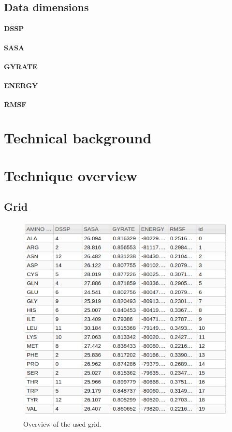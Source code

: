 \documentclass[10pt, conference]{IEEEtran}
\begin{document}
\subsection{Data dimensions}

\paragraph*{DSSP}
%


\paragraph*{SASA}
%


\paragraph*{GYRATE}
%


\paragraph*{ENERGY}
%


\paragraph*{RMSF}
%


\section{Technical background}
%

\section{Technique overview}
%

\subsection{Grid}
\begin{figure}
\includegraphics[width=0.8\linewidth]{figs/grid.png}
\caption{Overview of the used grid.} 
\label{fig:grid}
\end{figure}
\end{document}
